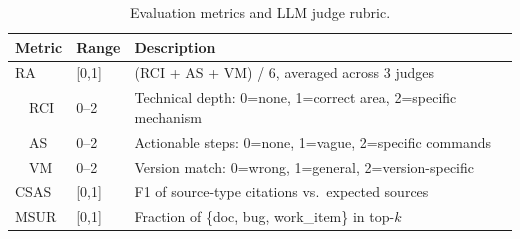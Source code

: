 \begin{table}[t]
\caption{Evaluation metrics and LLM judge rubric.}
\label{tab:metrics}
\centering
\small
\begin{tabular}{llp{6cm}}
\toprule
Metric & Range & Description \\
\midrule
RA & [0,1] & (RCI + AS + VM) / 6, averaged across 3 judges \\
\ \ RCI & 0--2 & Technical depth: 0=none, 1=correct area, 2=specific mechanism \\
\ \ AS & 0--2 & Actionable steps: 0=none, 1=vague, 2=specific commands \\
\ \ VM & 0--2 & Version match: 0=wrong, 1=general, 2=version-specific \\
\midrule
CSAS & [0,1] & F1 of source-type citations vs.\ expected sources \\
MSUR & [0,1] & Fraction of \{doc, bug, work\_item\} in top-$k$ \\
\bottomrule
\end{tabular}
\end{table}